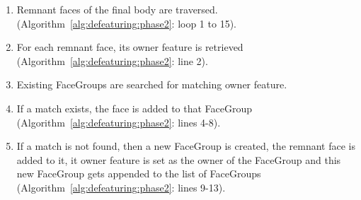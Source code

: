 \begin{enumerate}
[noitemsep,topsep=2pt,parsep=2pt,partopsep=2pt]
\item Remnant faces of the final body are traversed. (Algorithm~\ref{alg:defeaturing:phase2}: loop 1 to 15).  
\item For each remnant face, its owner feature is retrieved (Algorithm~\ref{alg:defeaturing:phase2}: line 2).
\item Existing FaceGroups are searched for matching owner feature.
\item If a match exists, the face is added to that FaceGroup  (Algorithm~\ref{alg:defeaturing:phase2}: lines 4-8).
\item If a match is not found, then a new FaceGroup is created, the remnant face is added to it, it owner feature is set as the owner of the FaceGroup and this new FaceGroup gets appended to the list of FaceGroups  (Algorithm~\ref{alg:defeaturing:phase2}: lines 9-13).

\bigskip

\begin{minipage}{\linewidth}


\end{minipage}
\end{enumerate}
